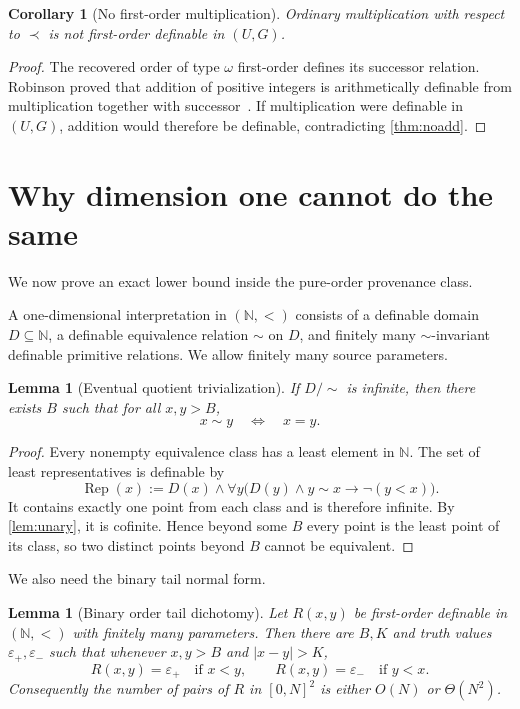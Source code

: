 \documentclass[11pt]{article}
\newtheorem{lemma}[theorem]{Lemma}
\newtheorem{corollary}[theorem]{Corollary}
\theoremstyle{definition}
\newcommand{\N}{\mathbb N}
\begin{document}
\begin{corollary}[No first-order multiplication]\label{cor:nomult}
Ordinary multiplication with respect to $\prec$ is not first-order definable in $(U,G)$.
\end{corollary}

\begin{proof}
The recovered order of type $\omega$ first-order defines its successor relation.  Robinson proved that addition of positive integers is arithmetically definable from multiplication together with successor~\cite{Robinson1949}.  If multiplication were definable in $(U,G)$, addition would therefore be definable, contradicting \cref{thm:noadd}.
\end{proof}

\section{Why dimension one cannot do the same}

We now prove an exact lower bound inside the pure-order provenance class.

A one-dimensional interpretation in $(\N,<)$ consists of a definable domain $D\subseteq\N$, a definable equivalence relation $\sim$ on $D$, and finitely many $\sim$-invariant definable primitive relations.  We allow finitely many source parameters.

\begin{lemma}[Eventual quotient trivialization]\label{lem:quotient}
If $D/{\sim}$ is infinite, then there exists $B$ such that for all $x,y>B$,
\[
x\sim y\quad\Longleftrightarrow\quad x=y.
\]
\end{lemma}

\begin{proof}
Every nonempty equivalence class has a least element in $\N$.  The set of least representatives is definable by
\[
\operatorname{Rep}(x):=D(x)\wedge
\forall y\bigl(D(y)\wedge y\sim x\to\neg(y<x)\bigr).
\]
It contains exactly one point from each class and is therefore infinite.  By \cref{lem:unary}, it is cofinite.  Hence beyond some $B$ every point is the least point of its class, so two distinct points beyond $B$ cannot be equivalent.
\end{proof}

We also need the binary tail normal form.

\begin{lemma}[Binary order tail dichotomy]\label{lem:binarytail}
Let $R(x,y)$ be first-order definable in $(\N,<)$ with finitely many parameters.  Then there are $B,K$ and truth values $\varepsilon_+,\varepsilon_-$ such that whenever $x,y>B$ and $|x-y|>K$,
\[
R(x,y)=\varepsilon_+\quad\text{if }x<y,
\qquad
R(x,y)=\varepsilon_-\quad\text{if }y<x.
\]
Consequently the number of pairs of $R$ in $[0,N]^2$ is either $O(N)$ or $\Theta(N^2)$.
\end{lemma}
\end{document}
